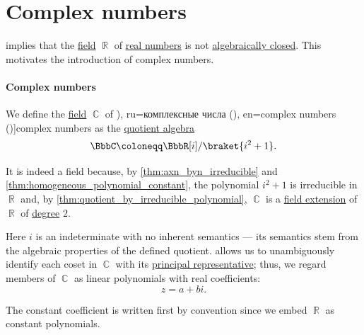 \section{Complex numbers}\label{sec:complex_numbers}

 implies that the \hyperref[def:field]{field} \( \BbbR \) of \hyperref[def:real_numbers]{real numbers} is not \hyperref[def:algebraically_closed_field]{algebraically closed}. This motivates the introduction of complex numbers.

\paragraph{Complex numbers}

\begin{definition}\label{def:complex_numbers}\mimprovised
  We define the \hyperref[def:field]{field} \( \BbbC \) of \term[bg=комплексни числа (\cite[296]{ИлинСадовничиСендов1984АнализТом1}), ru=комплексные числа (\cite[12]{Маркушевич1967АналитическиеФункцииТом1}), en=complex numbers (\cite[1]{Ahlfors1979ComplexAnalysis})]{complex numbers} as the \hyperref[def:algebra_over_ring/quotient]{quotient algebra}
  \begin{equation}\label{eq:def:complex_numbers/quotient}
    \BbbC \coloneqq \BbbR[i] / \braket{ i^2 + 1 }.
  \end{equation}

  It is indeed a field because, by \cref{thm:axn_byn_irreducible} and \cref{thm:homogeneous_polynomial_constant}, the polynomial \( i^2 + 1 \) is irreducible in \( \BbbR \) and, by \cref{thm:quotient_by_irreducible_polynomial}, \( \BbbC \) is a \hyperref[def:field/subobject]{field extension} of \( \BbbR \) of \hyperref[def:field_extension_degree]{degree} \( 2 \).

  Here \( i \) is an indeterminate with no inherent semantics --- its semantics stem from the algebraic properties of the defined quotient.  allows us to unambiguously identify each coset in \( \BbbC \) with its \hyperref[def:quotient_polynomial_algebra_as_truncated]{principal representative}; thus, we regard members of \( \BbbC \) as linear polynomials with real coefficients:
  \begin{equation}\label{eq:def:complex_numbers/number}
    z = a + bi.
  \end{equation}

  The constant coefficient is written first by convention since we embed \( \BbbR \) as constant polynomials.


\end{definition}
